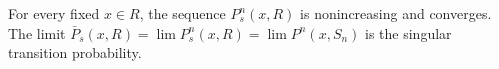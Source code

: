 For every fixed $x\in R$, the sequence $P_s^n(x,R)$ is nonincreasing and converges. The limit $\bar{P}_s(x,R)=\lim P_s^n(x,R)=\lim P^n(x,S_n)$ is the singular transition probability.
